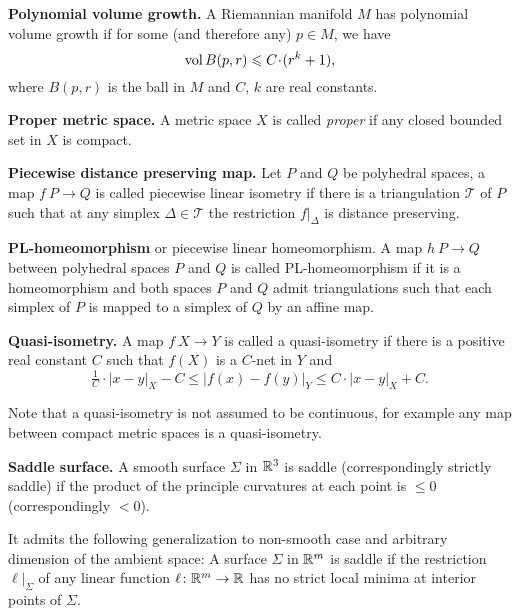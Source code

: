 \begin{description}
\item{\bf Polynomial volume growth.}\label{Polynomial volume growth} A Riemannian manifold $M$ has polynomial volume growth if for some (and therefore any) $p\in M$, 
we have 
$$\vol B(p,r)\z\le C\cdot (r^k+1),$$ 
where $B(p,r)$ is the ball in $M$ and  $C$, $k$ are real constants.

\item{\bf Proper metric space.}
\label{Proper metric space} 
A metric space $X$ is called \emph{proper} if any closed bounded set in $X$ is compact.

\item{\bf Piecewise distance preserving map.}%
%
\label{Piecewise distance preserving map} 
Let $P$ and $Q$ be polyhedral spaces, a map $f\:P\to Q$ is called piecewise linear isometry if there is a triangulation $\mathcal{T}$ of $P$ such that at any simplex $\Delta\in \mathcal{T}$ the restriction $f|_\Delta$ is distance preserving.

\item{\bf  PL-homeomorphism}\label{PL-homeomorphism} or piecewise linear homeomorphism.
A map $h\:P\to Q$ between polyhedral spaces $P$ and $Q$ is called PL-homeomorphism if it is a homeomorphism and both spaces $P$ and $Q$ admit triangulations such that each simplex of $P$ is mapped to a simplex of $Q$ by an affine map.

\item{\bf  Quasi-isometry.}\label{Quasi-isometry} A map $f\:X\to Y$ is called a quasi-isometry if there is a positive real constant $C$ such that $f(X)$ is a $C$-net in $Y$ and
$$\tfrac{1}{C}\cdot|x-y|_X-C
\le 
|f(x)-f(y)|_Y\le C\cdot|x-y|_X+C.$$

Note that a quasi-isometry is not assumed to be continuous, for example any map between compact metric spaces is a quasi-isometry.

\item{\bf Saddle surface.}\label{Saddle surface} A smooth surface $\Sigma$ in $\mathbb{R}^3$ is saddle 
(correspondingly strictly saddle) 
if  the product of the principle curvatures at each point is $\le 0$ (correspondingly $<0$).

It admits the following generalization to non-smooth case and arbitrary dimension of the ambient space:
A surface $\Sigma$ in $\mathbb{R}^m$ is saddle if the restriction $\ell|_\Sigma$ of any linear function $\ell\colon\mathbb{R}^m\to\mathbb{R}$ has no strict local minima at interior points of $\Sigma$.


\end{description}
